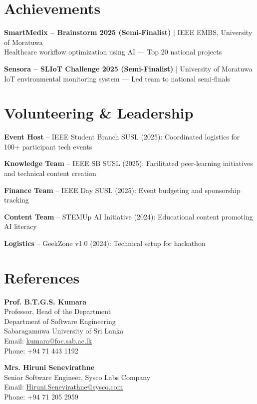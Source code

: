 \documentclass[letterpaper,10pt]{article}
\newenvironment{resume_list}{
  \vspace{-2pt}
  \begin{itemize}[itemsep=1pt, leftmargin=14pt]
}{
  \end{itemize}\vspace{-3pt}
}
\begin{document}
\section{Achievements}
\vspace{-1pt}

\textbf{SmartMedix – Brainstorm 2025 (Semi-Finalist)} | IEEE EMBS, University of Moratuwa\\
Healthcare workflow optimization using AI — Top 20 national projects

\textbf{Sensora – SLIoT Challenge 2025 (Semi-Finalist)} | University of Moratuwa\\
IoT environmental monitoring system — Led team to national semi-finals

\section{Volunteering \& Leadership}
\vspace{-1pt}
\begin{resume_list}
  \item \textbf{Event Host} – IEEE Student Branch SUSL (2025): Coordinated logistics for 100+ participant tech events
  \item \textbf{Knowledge Team} – IEEE SB SUSL (2025): Facilitated peer-learning initiatives and technical content creation
  \item \textbf{Finance Team} – IEEE Day SUSL (2025): Event budgeting and sponsorship tracking
  \item \textbf{Content Team} – STEMUp AI Initiative (2024): Educational content promoting AI literacy
  \item \textbf{Logistics} – GeekZone v1.0 (2024): Technical setup for hackathon
\end{resume_list}

\vspace{-2pt}
\section{References}
\vspace{-1pt}

\textbf{Prof. B.T.G.S. Kumara}\\
Professor, Head of the Department\\
Department of Software Engineering\\
Sabaragamuwa University of Sri Lanka\\
Email: \href{mailto:kumara@foc.sab.ac.lk}{kumara@foc.sab.ac.lk}\\
Phone: +94 71 443 1192

\vspace{3pt}
\textbf{Mrs. Hiruni Senevirathne}\\
Senior Software Engineer, Sysco Labs Company\\
Email: \href{mailto:Hiruni.Senevirathne@sysco.com}{Hiruni.Senevirathne@sysco.com}\\
Phone: +94 71 205 2959
\end{document}
